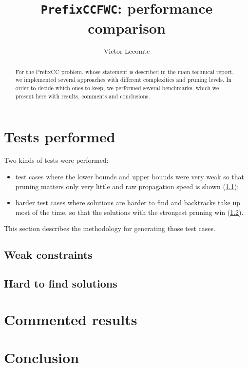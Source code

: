 \documentclass[a4paper,10pt]{article}
\begin{document}
\title{\texttt{PrefixCCFWC}: performance comparison}
\author{Victor Lecomte}
\maketitle

\begin{abstract}
For the PrefixCC problem, whose statement is described in the main technical report, we implemented several approaches with different complexities and pruning levels. In order to decide which ones to keep, we performed several benchmarks, which we present here with results, comments and conclusions.
\end{abstract}

\tableofcontents

\section{Tests performed}

Two kinds of tests were performed:
\begin{itemize}
    \item test cases where the lower bounds and upper bounds were very weak so that pruning matters only very little and raw propagation speed is shown (\ref{subsec:tests-weak});
    \item harder test cases where solutions are harder to find and backtracks take up most of the time, so that the solutions with the strongest pruning win (\ref{subsec:tests-hard}).
\end{itemize}

This section describes the methodology for generating those test cases.

\subsection{Weak constraints}
\label{subsec:tests-weak}
\subsection{Hard to find solutions}
\label{subsec:tests-hard}

\section{Commented results}

\section{Conclusion}
\end{document}
